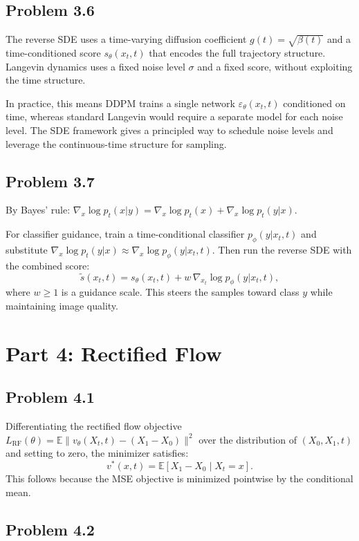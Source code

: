 \documentclass[11pt]{article}
\begin{document}
\subsection*{Problem 3.6}

The reverse SDE uses a time-varying diffusion coefficient $g(t) = \sqrt{\beta(t)}$ and a time-conditioned score $s_\theta(x_t, t)$ that encodes the full trajectory structure. Langevin dynamics uses a fixed noise level $\sigma$ and a fixed score, without exploiting the time structure.

In practice, this means DDPM trains a single network $\varepsilon_\theta(x_t, t)$ conditioned on time, whereas standard Langevin would require a separate model for each noise level. The SDE framework gives a principled way to schedule noise levels and leverage the continuous-time structure for sampling.

\subsection*{Problem 3.7}

By Bayes' rule: $\nabla_x \log p_t(x|y) = \nabla_x \log p_t(x) + \nabla_x \log p_t(y|x)$.

For classifier guidance, train a time-conditional classifier $p_\phi(y|x_t, t)$ and substitute $\nabla_x \log p_t(y|x) \approx \nabla_x \log p_\phi(y|x_t, t)$. Then run the reverse SDE with the combined score:
\[
\tilde{s}(x_t, t) = s_\theta(x_t, t) + w\,\nabla_{x_t} \log p_\phi(y|x_t, t),
\]
where $w \geq 1$ is a guidance scale. This steers the samples toward class $y$ while maintaining image quality.

\section*{Part 4: Rectified Flow}

\subsection*{Problem 4.1}

Differentiating the rectified flow objective $L_\mathrm{RF}(\theta) = \mathbb{E}\|v_\theta(X_t, t) - (X_1 - X_0)\|^2$ over the distribution of $(X_0, X_1, t)$ and setting to zero, the minimizer satisfies:
\[
v^*(x, t) = \mathbb{E}[X_1 - X_0 \mid X_t = x].
\]
This follows because the MSE objective is minimized pointwise by the conditional mean.

\subsection*{Problem 4.2}
\end{document}
